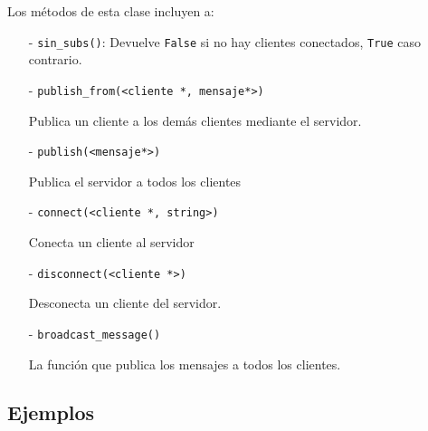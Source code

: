 Los métodos de esta clase incluyen a:

\begin{itemize}
    \item[-] \verb|sin_subs()|:
    Devuelve \verb|False| si no hay clientes conectados, \verb|True| caso contrario.
    
    \item[-] \verb|publish_from(<cliente *, mensaje*>)| 
    
    Publica un cliente a los demás clientes mediante el servidor.
    
    \item[-] \verb|publish(<mensaje*>)|
    
    Publica el servidor a todos los clientes

    \item[-] \verb|connect(<cliente *, string>)| 
    
    Conecta un cliente al servidor
    
    \item[-] \verb|disconnect(<cliente *>)|  
    
    Desconecta un cliente del servidor.
    
    \item[-] \verb|broadcast_message()| 
    
    La función que publica los mensajes a todos los clientes.
\end{itemize}



\subsection{Ejemplos}



